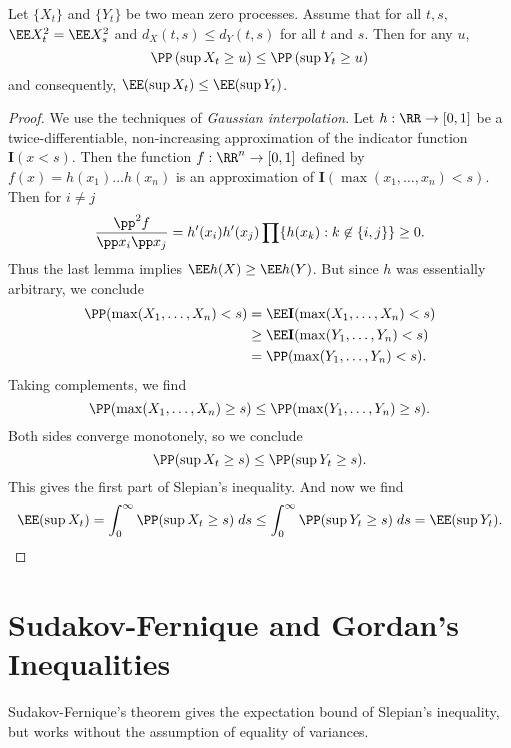 \begin{theorem}
    Let $\{ X_t \}$ and $\{ Y_t \}$ be two mean zero processes. Assume that for all $t,s$, $\EE X_t^2 = \EE X_s^2$ and $d_X(t,s) \leq d_Y(t,s)$ for all $t$ and $s$. Then for any $u$,
    \[ \PP \left( \sup X_t \geq u \right) \leq \PP \left( \sup Y_t \geq u \right) \]
    and consequently, $\EE(\sup X_t) \leq \EE(\sup Y_t)$.
\end{theorem}
\begin{proof}
    We use the techniques of {\it Gaussian interpolation}. Let $h: \RR \to [0,1]$ be a twice-differentiable, non-increasing approximation of the indicator function $\mathbf{I}(x < s)$. Then the function $f: \RR^n \to [0,1]$ defined by $f(x) = h(x_1) \dots h(x_n)$ is an approximation of $\mathbf{I}(\max(x_1, \dots, x_n) < s)$. Then for $i \neq j$
    \[ \frac{\pp^2 f}{\pp x_i \pp x_j} = h'(x_i) h'(x_j) \prod \{ h(x_k) : k \not \in \{ i, j \} \} \geq 0. \]
    Thus the last lemma implies $\EE h(X) \geq \EE h(Y)$. But since $h$ was essentially arbitrary, we conclude
    \begin{align*}
        \PP(\max(X_1, \dots, X_n) < s) &= \EE \mathbf{I}(\max(X_1, \dots, X_n) < s)\\
        &\geq \EE \mathbf{I}(\max(Y_1, \dots, Y_n) < s)\\
        &= \PP(\max(Y_1, \dots, Y_n) < s).
    \end{align*}
    Taking complements, we find
    \[ \PP(\max(X_1, \dots, X_n) \geq s) \leq \PP(\max(Y_1, \dots, Y_n) \geq s). \]
    Both sides converge monotonely, so we conclude
    \[ \PP(\sup X_t \geq s) \leq \PP(\sup Y_t \geq s). \]
    This gives the first part of Slepian's inequality. And now we find
    \[ \EE(\sup X_t) = \int_0^\infty \PP(\sup X_t \geq s)\; ds \leq \int_0^\infty \PP(\sup Y_t \geq s)\; ds = \EE(\sup Y_t). \qedhere \]
\end{proof}








\section{Sudakov-Fernique and Gordan's Inequalities}

Sudakov-Fernique's theorem gives the expectation bound of Slepian's inequality, but works without the assumption of equality of variances.

